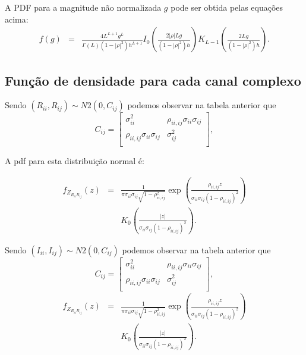 A PDF para a magnitude não normalizada $g$ pode ser obtida pelas equações acima:
\begin{equation}
\begin{array}{ccc}
	f(g)&=&\frac{4L^{L+1}g^L}{\Gamma(L)(1-|\rho|^2)h^{L+1}}I_0\left(\frac{2|\rho|Lg}{(1-|\rho|^2)h}\right)K_{L-1}\left(\frac{2Lg}{(1-|\rho|^2)h}\right).
		\end{array}
\end{equation}

\subsection{Função de densidade para cada canal complexo}

Sendo $(R_{ii}, R_{ij})\sim N2(0, C_{ij})$ podemos observar na tabela anterior que 
\begin{equation}
C_{ij}=\left[
\begin{array}{cc}
	\sigma_{ii}^2   &  \rho_{ii,ij}\sigma_{ii}\sigma_{ij}  \\
	\rho_{ii,ij}\sigma_{ii}\sigma_{ij} & \sigma_{ij}^2   \\
\end{array}
\right],
\end{equation}

A pdf para esta distribuição normal é:

\begin{equation}
\begin{array}{ccc}
	f_{Z_{R_{ii}R_{ij}}}(z)&=&\frac{1}{\pi\sigma_{ii}\sigma_{ij}\sqrt{1-\rho_{ii,ij}^2}}\exp\left(\frac{\rho_{ii,ij}z}{\sigma_{ii}\sigma_{ij}(1-\rho_{ii,ij})^2}\right)\\
	&&K_0\left(\frac{|z|}{\sigma_{ii}\sigma_{ij}(1-\rho_{ii,ij})^2}\right).
\end{array}
\end{equation}


Sendo $(I_{ii}, I_{ij})\sim N2(0, C_{ij})$ podemos observar na tabela anterior que 
\begin{equation}
C_{ij}=\left[
\begin{array}{cc}
	\sigma_{ii}^2   &  \rho_{ii,ij}\sigma_{ii}\sigma_{ij}  \\
	\rho_{ii,ij}\sigma_{ii}\sigma_{ij} & \sigma_{ij}^2   \\
\end{array}
\right],
\end{equation}
\begin{equation}
\begin{array}{ccc}
	f_{Z_{R_{ii}R_{ij}}}(z)&=&\frac{1}{\pi\sigma_{ii}\sigma_{ij}\sqrt{1-\rho_{ii,ij}^2}}\exp\left(\frac{\rho_{ii,ij}z}{\sigma_{ii}\sigma_{ij}(1-\rho_{ii,ij})^2}\right)\\
	&&K_0\left(\frac{|z|}{\sigma_{ii}\sigma_{ij}(1-\rho_{ii,ij})^2}\right).
\end{array}
\end{equation}

